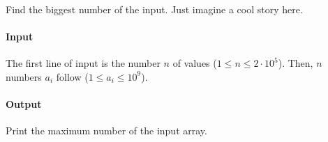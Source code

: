 



\makeheader

Find the biggest number of the input. Just imagine a cool story here.

\paragraph*{Input}

The first line of input is the number $n$ of values ($1 \leq n \leq 2 \cdot 10^5$). Then, $n$ numbers $a_i$ follow ($1 \leq a_i \leq 10^9$).

\paragraph*{Output}

Print the maximum number of the input array.

\begin{samples}
\end{samples}

